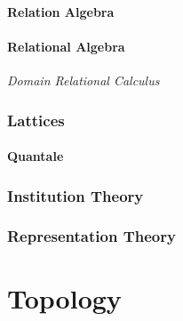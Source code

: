 \documentclass{article}
\begin{document}
\subsection{Relation Algebra}

\subsection{Relational Algebra}

\emph{Domain Relational Calculus}

\section{Lattices}

\subsection{Quantale}

\section{Institution Theory}\label{subsec:institution_theory}

\section{Representation Theory}

\part{Topology}\label{sec:topology}
\end{document}
